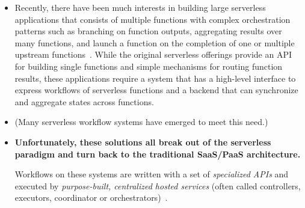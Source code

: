 \begin{itemize}
\begin{enumerate}
    \end{enumerate}

  \item Recently, there have been much interests in building large serverless
  applications that consists of multiple functions with complex orchestration
  patterns such as branching on function outputs, aggregating results over
  many functions, and launch a function on the completion of one or multiple
  upstream functions~\cite{excamera, kappa, pywren, google-workflows,
  durable-functions, gg-atc}. While the original serverless offerings provide
  an API for building single functions and simple mechanisms for routing
  function results, these applications require a system that has a high-level
  interface to express workflows of serverless functions and a backend that
  can synchronize and aggregate states across functions.






  \item (Many serverless workflow systems have emerged to meet this need.)


  \item \textbf{Unfortunately, these solutions all break out of the serverless
  paradigm and turn back to the traditional SaaS/PaaS architecture.}

  Workflows on these systems are written with a set of \emph{specialized APIs}
  and executed by \emph{purpose-built, centralized hosted services}
  (often called controllers, executors, coordinator or
  orchestrators)~\cite{gg-atc, excamera, kappa, triggerflow, pywren,
  durable-functions, aws-step-functions, google-cloud-composer,
  google-workflows}.


\end{itemize}
